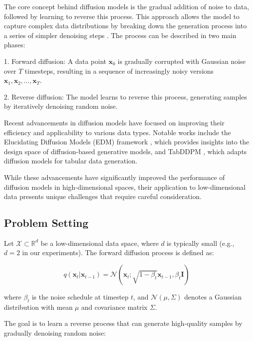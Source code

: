 \documentclass{article} %
\begin{document}
The core concept behind diffusion models is the gradual addition of noise to data, followed by learning to reverse this process. This approach allows the model to capture complex data distributions by breaking down the generation process into a series of simpler denoising steps \cite{yang2023diffusion}. The process can be described in two main phases:

1. Forward diffusion: A data point $\mathbf{x}_0$ is gradually corrupted with Gaussian noise over $T$ timesteps, resulting in a sequence of increasingly noisy versions $\mathbf{x}_1, \mathbf{x}_2, \ldots, \mathbf{x}_T$.

2. Reverse diffusion: The model learns to reverse this process, generating samples by iteratively denoising random noise.

Recent advancements in diffusion models have focused on improving their efficiency and applicability to various data types. Notable works include the Elucidating Diffusion Models (EDM) framework \cite{edm}, which provides insights into the design space of diffusion-based generative models, and TabDDPM \cite{kotelnikov2022tabddpm}, which adapts diffusion models for tabular data generation.

While these advancements have significantly improved the performance of diffusion models in high-dimensional spaces, their application to low-dimensional data presents unique challenges that require careful consideration.

\subsection{Problem Setting}

Let $\mathcal{X} \subset \mathbb{R}^d$ be a low-dimensional data space, where $d$ is typically small (e.g., $d=2$ in our experiments). The forward diffusion process is defined as:

\begin{equation}
    q(\mathbf{x}_t | \mathbf{x}_{t-1}) = \mathcal{N}(\mathbf{x}_t; \sqrt{1 - \beta_t}\mathbf{x}_{t-1}, \beta_t\mathbf{I})
\end{equation}

where $\beta_t$ is the noise schedule at timestep $t$, and $\mathcal{N}(\mu, \Sigma)$ denotes a Gaussian distribution with mean $\mu$ and covariance matrix $\Sigma$.

The goal is to learn a reverse process that can generate high-quality samples by gradually denoising random noise:
\end{document}

